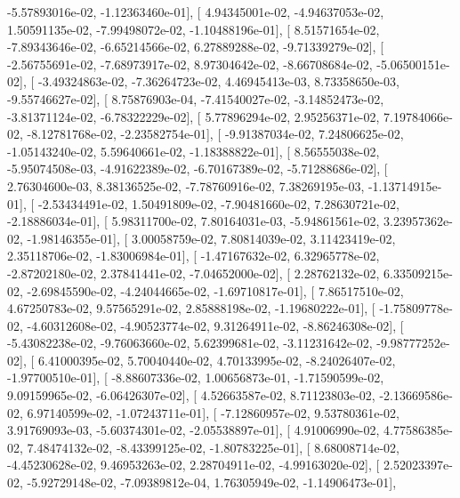 \documentclass{article}
\begin{document}
         -5.57893016e-02,  -1.12363460e-01],
       [  4.94345001e-02,  -4.94637053e-02,   1.50591135e-02,
         -7.99498072e-02,  -1.10488196e-01],
       [  8.51571654e-02,  -7.89343646e-02,  -6.65214566e-02,
          6.27889288e-02,  -9.71339279e-02],
       [ -2.56755691e-02,  -7.68973917e-02,   8.97304642e-02,
         -8.66708684e-02,  -5.06500151e-02],
       [ -3.49324863e-02,  -7.36264723e-02,   4.46945413e-03,
          8.73358650e-03,  -9.55746627e-02],
       [  8.75876903e-04,  -7.41540027e-02,  -3.14852473e-02,
         -3.81371124e-02,  -6.78322229e-02],
       [  5.77896294e-02,   2.95256371e-02,   7.19784066e-02,
         -8.12781768e-02,  -2.23582754e-01],
       [ -9.91387034e-02,   7.24806625e-02,  -1.05143240e-02,
          5.59640661e-02,  -1.18388822e-01],
       [  8.56555038e-02,  -5.95074508e-03,  -4.91622389e-02,
         -6.70167389e-02,  -5.71288686e-02],
       [  2.76304600e-03,   8.38136525e-02,  -7.78760916e-02,
          7.38269195e-03,  -1.13714915e-01],
       [ -2.53434491e-02,   1.50491809e-02,  -7.90481660e-02,
          7.28630721e-02,  -2.18886034e-01],
       [  5.98311700e-02,   7.80164031e-03,  -5.94861561e-02,
          3.23957362e-02,  -1.98146355e-01],
       [  3.00058759e-02,   7.80814039e-02,   3.11423419e-02,
          2.35118706e-02,  -1.83006984e-01],
       [ -1.47167632e-02,   6.32965778e-02,  -2.87202180e-02,
          2.37841441e-02,  -7.04652000e-02],
       [  2.28762132e-02,   6.33509215e-02,  -2.69845590e-02,
         -4.24044665e-02,  -1.69710817e-01],
       [  7.86517510e-02,   4.67250783e-02,   9.57565291e-02,
          2.85888198e-02,  -1.19680222e-01],
       [ -1.75809778e-02,  -4.60312608e-02,  -4.90523774e-02,
          9.31264911e-02,  -8.86246308e-02],
       [ -5.43082238e-02,  -9.76063660e-02,   5.62399681e-02,
         -3.11231642e-02,  -9.98777252e-02],
       [  6.41000395e-02,   5.70040440e-02,   4.70133995e-02,
         -8.24026407e-02,  -1.97700510e-01],
       [ -8.88607336e-02,   1.00656873e-01,  -1.71590599e-02,
          9.09159965e-02,  -6.06426307e-02],
       [  4.52663587e-02,   8.71123803e-02,  -2.13669586e-02,
          6.97140599e-02,  -1.07243711e-01],
       [ -7.12860957e-02,   9.53780361e-02,   3.91769093e-03,
         -5.60374301e-02,  -2.05538897e-01],
       [  4.91006990e-02,   4.77586385e-02,   7.48474132e-02,
         -8.43399125e-02,  -1.80783225e-01],
       [  8.68008714e-02,  -4.45230628e-02,   9.46953263e-02,
          2.28704911e-02,  -4.99163020e-02],
       [  2.52023397e-02,  -5.92729148e-02,  -7.09389812e-04,
          1.76305949e-02,  -1.14906473e-01],
\end{document}

